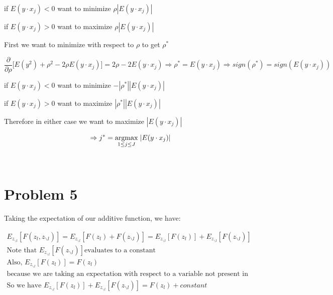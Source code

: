 \documentclass[11pt]{article}
\begin{document}
if $E(y \cdot x_j) < 0$ want to minimize $\rho |E(y \cdot x_j)|$ 

if $E(y \cdot x_j) > 0$ want to maximize $\rho |E(y \cdot x_j)|$ 

First we want to minimize with respect to $\rho$ to get $\rho^*$

$$\frac{\partial}{\partial \rho} \bigg[ E(y^2) + 
\rho^2 - 2 \rho E(y \cdot x_j) \bigg] = 
2 \rho - 2 E(y \cdot x_j) \Rightarrow \rho^* = 
E(y \cdot x_j) \Rightarrow sign(\rho^*) = sign(E(y \cdot x_j))$$ 

if $E(y \cdot x_j) < 0$ want to minimize $- |\rho^*| |E(y \cdot x_j)|$

if $E(y \cdot x_j) > 0$ want to maximize $ |\rho^*| |E(y \cdot x_j)|$

Therefore in either case we want to maximize $|E(y \cdot x_j)|$

$$ \Rightarrow j^* = 
\underset{1 \leq j \leq J}{\operatorname{argmax}}\hspace{1mm} |E(y \cdot x_j)|$$

\newpage
\begin{center}
\ \\
\end{center}

\section*{Problem 5}

\vspace{1 mm}
\noindent
Taking the expectation of our additive function, we have:

\begin{gather*}
E_{z_{\backslash l}}[F(z_{l}, z_{\backslash l})] = 
E_{z_{\backslash l}}[F(z_{l}) + F(z_{\backslash l})] = 
E_{z_{\backslash l}}[F(z_{l})] + E_{z_{\backslash l}}[F(z_{\backslash l})]\\
\text{Note that } E_{z_{\backslash l}}[F(z_{\backslash l})] 
\text{evaluates to a constant}\\
\text{Also, } E_{z_{\backslash l}}[F(z_{l})] = F(z_{l})\\
\text{because we are taking an expectation with respect to a variable not present in the function}\\
\text{So we have } 
E_{z_{\backslash l}}[F(z_{l})] + E_{z_{\backslash l}}[F(z_{\backslash l})] = 
F(z_{l}) + constant
\end{gather*}
\end{document}
